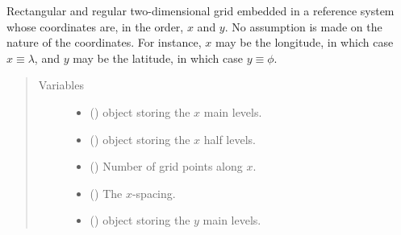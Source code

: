 \documentclass[letterpaper,10pt,english]{sphinxmanual}
\begin{document}
\begin{fulllineitems}
\label{\detokenize{api:grids.xy_grid.XYGrid}}
Rectangular and regular two-dimensional grid embedded in a reference system whose
coordinates are, in the order, \(x\) and \(y\). No assumption is made on
the nature of the coordinates. For instance, \(x\) may be the longitude, in
which case \(x \equiv \lambda\), and \(y\) may be the latitude, in which
case \(y \equiv \phi\).
\begin{quote}\begin{description}
\item[{Variables}] \leavevmode\begin{itemize}
\item {} 
{\hyperref[\detokenize{api:grids.xyz_grid.XYZGrid.x}]{}} () \textendash{} {\hyperref[\detokenize{api:grids.axis.Axis}]{}} object storing the \(x\) main levels.

\item {} 
{\hyperref[\detokenize{api:grids.xyz_grid.XYZGrid.x_half_levels}]{}} () \textendash{} {\hyperref[\detokenize{api:grids.axis.Axis}]{}} object storing the \(x\) half levels.

\item {} 
{\hyperref[\detokenize{api:grids.xyz_grid.XYZGrid.nx}]{}} () \textendash{} Number of grid points along \(x\).

\item {} 
{\hyperref[\detokenize{api:grids.xyz_grid.XYZGrid.dx}]{}} () \textendash{} The \(x\)-spacing.

\item {} 
{\hyperref[\detokenize{api:grids.xyz_grid.XYZGrid.y}]{}} () \textendash{} {\hyperref[\detokenize{api:grids.axis.Axis}]{}} object storing the \(y\) main levels.


\end{itemize}
\end{description}
\end{quote}
\end{fulllineitems}
\end{document}
